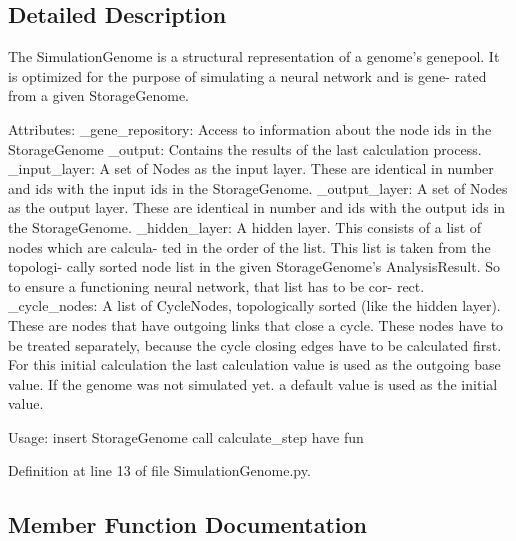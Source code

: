 \subsection{Detailed Description}
\begin{DoxyVerb}The SimulationGenome is a structural representation of a genome's genepool.
It is optimized for the purpose of simulating a neural network and is gene-
rated from a given StorageGenome.

Attributes:
    _gene_repository:
        Access to information about the node ids in the StorageGenome
    _output:
        Contains the results of the last calculation process.
    _input_layer:
        A set of Nodes as the input layer. These are identical in number and
         ids with the input ids in the StorageGenome.
    _output_layer:
        A set of Nodes as the output layer. These are identical in number
        and ids with the output ids in the StorageGenome.
    _hidden_layer:
        A hidden layer. This consists of a list of nodes which are calcula-
        ted in the order of the list. This list is taken from the topologi-
        cally sorted node list in the given StorageGenome's AnalysisResult.
        So to ensure a functioning neural network, that list has to be cor-
        rect.
    _cycle_nodes:
        A list of CycleNodes, topologically sorted (like the hidden layer).
        These are nodes that have outgoing links that close a cycle. These
        nodes have to be treated separately, because the cycle closing edges
        have to be calculated first. For this initial calculation the last
        calculation value is used as the outgoing base value. If the genome
        was not simulated yet. a default value is used as the initial value.

Usage:
    insert StorageGenome
    call calculate_step
    have fun
\end{DoxyVerb}
 

Definition at line 13 of file Simulation\+Genome.\+py.



\subsection{Member Function Documentation}
